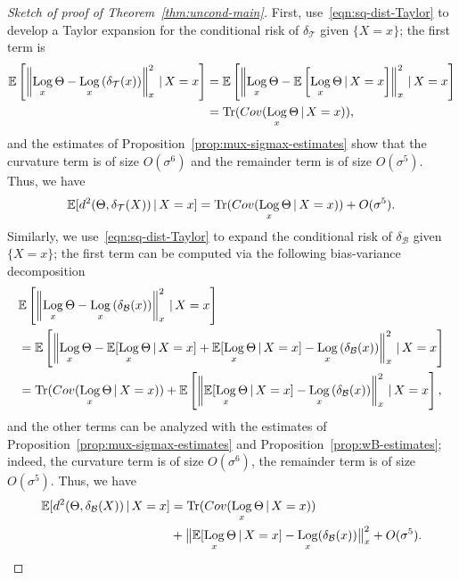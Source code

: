 \documentclass[10pt,a4paper]{amsart}
\DeclareMathOperator{\Log}{Log}
\newcommand{\B}{\mathcal{B}}
\newcommand{\Cov}{\textnormal{Cov}}
\newcommand{\Ebb}{\mathbb{E}}
\newcommand{\T}{\mathcal{T}}
\newcommand{\trace}{\operatorname{Tr}}
\begin{document}
\begin{proof}[Sketch of proof of Theorem~\ref{thm:uncond-main}]
    First, use~\eqref{eqn:sq-dist-Taylor} to develop a Taylor expansion for the conditional risk of $\delta_{\T}$ given $\{X=x\}$; the first term is 
    \begin{align*}
        \Ebb\left[\left\|\Log_x\Theta-\Log_x\left(\delta_{\T}(x)\right)\right\|_x^2\,|\,X=x\right] &= \Ebb\left[\left\|\Log_x\Theta-\Ebb\left[\Log_x\Theta\,|\,X=x\right]\right\|_x^2\,|\,X=x\right] \\
        &= \trace(\Cov(\Log_x\Theta\,|\,X=x)),
    \end{align*}
    and the estimates of Proposition~\ref{prop:mux-sigmax-estimates} show that the curvature term is of size $O(\sigma^6)$ and the remainder term is of size $O(\sigma^5)$.
    Thus, we have
    \begin{equation}\label{eqn:proof-sketch-1}
        \Ebb[d^2(\Theta,\delta_{\T}(X))\,|\,X=x] = \trace(\Cov(\Log_x\Theta\,|\,X=x)) + O(\sigma^5).
    \end{equation}
    Similarly, we use~\eqref{eqn:sq-dist-Taylor} to expand the conditional risk of $\delta_{\B}$ given $\{X=x\}$; the first term can be computed via the following bias-variance decomposition
    \begin{align*}
        &\Ebb\left[\left\|\Log_x\Theta-\Log_x\left(\delta_{\B}(x)\right)\right\|_x^2\,|\,X=x\right] \\
        &=\Ebb\left[\left\|\Log_x\Theta-\Ebb[\Log_x\Theta\,|\,X=x]+\Ebb[\Log_x\Theta\,|\,X=x]-\Log_x\left(\delta_{\B}(x)\right)\right\|_x^2\,|\,X=x\right] \\
        &=\trace(\Cov(\Log_x\Theta\,|\,X=x)) + \Ebb\left[\left\|\Ebb[\Log_x\Theta\,|\,X=x] - \Log_x\left(\delta_{\B}(x)\right)\right\|_x^2\,|\,X=x\right],
    \end{align*}
    and the other terms can be analyzed with the estimates of Proposition~\ref{prop:mux-sigmax-estimates} and Proposition~\ref{prop:wB-estimates}; indeed, the curvature term is of size $O(\sigma^6)$, the remainder term is of size $O(\sigma^5)$.
    Thus, we have
    \begin{equation}\label{eqn:proof-sketch-2}
        \begin{split}
        \Ebb[d^2(\Theta,\delta_{\B}(X))\,|\,X=x] &= \trace(\Cov(\Log_x\Theta\,|\,X=x)) \\
        &+ \big\|\Ebb[\Log_x\Theta\,|\,X=x]-\Log_x(\delta_{\B}(x)) \big\|_x^2 + O(\sigma^5).
        \end{split}
    \end{equation}

\end{proof}
\end{document}
